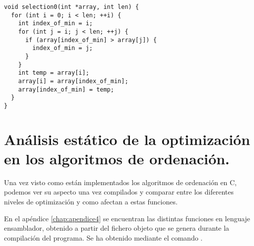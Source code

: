 \begin{lstlisting}[caption=Implementación de Selection Sort]
void selection0(int *array, int len) {
  for (int i = 0; i < len; ++i) {
    int index_of_min = i;
    for (int j = i; j < len; ++j) {
      if (array[index_of_min] > array[j]) {
        index_of_min = j;
      }
    }
    int temp = array[i];
    array[i] = array[index_of_min];
    array[index_of_min] = temp;
  }
}
\end{lstlisting}

\section{Análisis estático de la optimización en los algoritmos de ordenación.}
Una vez visto como están implementados los algoritmos de ordenación en C, podemos ver su aspecto una vez compilados y comparar entre los diferentes niveles de optimización y como afectan a estas funciones.

En el apéndice \ref{chap:apendice4} se encuentran las distintas funciones en lenguaje ensamblador, obtenido a partir del fichero objeto  que se genera durante la compilación del programa. Se ha obtenido mediante el comando .

